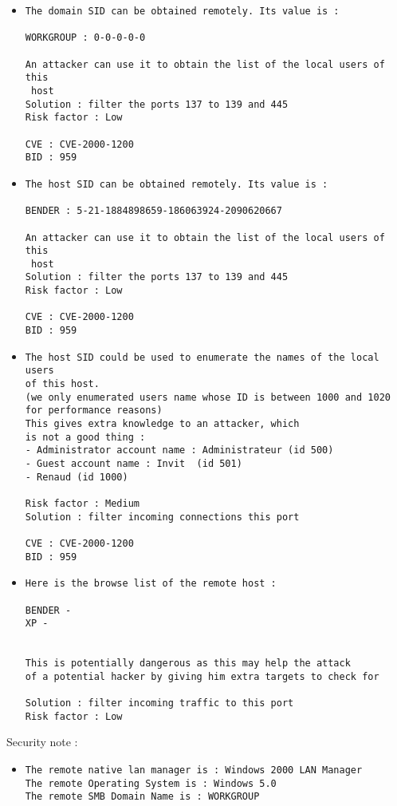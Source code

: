 \documentclass{article}
\begin{document}
\begin{itemize}
\item \begin{verbatim}
The domain SID can be obtained remotely. Its value is :

WORKGROUP : 0-0-0-0-0

An attacker can use it to obtain the list of the local users of this
 host
Solution : filter the ports 137 to 139 and 445
Risk factor : Low

CVE : CVE-2000-1200
BID : 959
\end{verbatim}\item \begin{verbatim}
The host SID can be obtained remotely. Its value is :

BENDER : 5-21-1884898659-186063924-2090620667

An attacker can use it to obtain the list of the local users of this
 host
Solution : filter the ports 137 to 139 and 445
Risk factor : Low

CVE : CVE-2000-1200
BID : 959
\end{verbatim}\item \begin{verbatim}
The host SID could be used to enumerate the names of the local users
of this host. 
(we only enumerated users name whose ID is between 1000 and 1020
for performance reasons)
This gives extra knowledge to an attacker, which
is not a good thing : 
- Administrator account name : Administrateur (id 500)
- Guest account name : Invit  (id 501)
- Renaud (id 1000)

Risk factor : Medium
Solution : filter incoming connections this port

CVE : CVE-2000-1200
BID : 959
\end{verbatim}\item \begin{verbatim}
Here is the browse list of the remote host : 

BENDER - 
XP - 


This is potentially dangerous as this may help the attack
of a potential hacker by giving him extra targets to check for

Solution : filter incoming traffic to this port
Risk factor : Low

\end{verbatim}\end{itemize}
Security note :\\
\begin{itemize}
\item \begin{verbatim}
The remote native lan manager is : Windows 2000 LAN Manager
The remote Operating System is : Windows 5.0
The remote SMB Domain Name is : WORKGROUP


\end{verbatim}\end{itemize}
\end{document}
